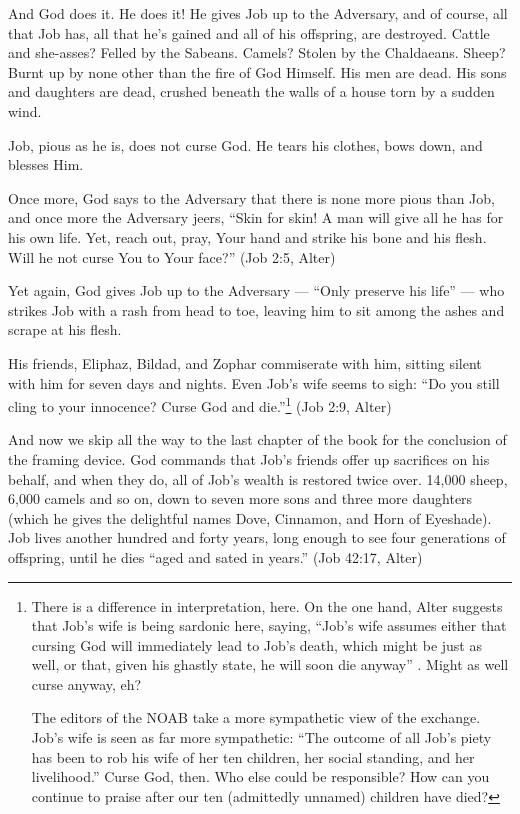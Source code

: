 And God does it. He does it! He gives Job up to the Adversary, and of course, all that Job has, all that he's gained and all of his offspring, are destroyed. Cattle and she-asses? Felled by the Sabeans. Camels? Stolen by the Chaldaeans. Sheep? Burnt up by none other than the fire of God Himself. His men are dead. His sons and daughters are dead, crushed beneath the walls of a house torn by a sudden wind.

Job, pious as he is, does not curse God. He tears his clothes, bows down, and blesses Him.

Once more, God says to the Adversary that there is none more pious than Job, and once more the Adversary jeers, ``Skin for skin! A man will give all he has for his own life. Yet, reach out, pray, Your hand and strike his bone and his flesh. Will he not curse You to Your face?'' (Job 2:5, Alter)

Yet again, God gives Job up to the Adversary --- ``Only preserve his life'' --- who strikes Job with a rash from head to toe, leaving him to sit among the ashes and scrape at his flesh.

His friends, Eliphaz, Bildad, and Zophar commiserate with him, sitting silent with him for seven days and nights. Even Job's wife seems to sigh: ``Do you still cling to your innocence? Curse God and die.''\footnote{There is a difference in interpretation, here. On the one hand, Alter suggests that Job's wife is being sardonic here, saying, ``Job's wife assumes either that cursing God will immediately lead to Job's death, which might be just as well, or that, given his ghastly state, he will soon die anyway'' \parencite[469]{alter}. Might as well curse anyway, eh?

  The editors of the NOAB take a more sympathetic view of the exchange. Job's wife is seen as far more sympathetic: ``The outcome of all Job's piety has been to rob his wife of her ten children, her social standing, and her livelihood.'' \parencite[737]{noab} Curse God, then. Who else could be responsible? How can you continue to praise after our ten (admittedly unnamed) children have died?} (Job 2:9, Alter)

And now we skip all the way to the last chapter of the book for the conclusion of the framing device. God commands that Job's friends offer up sacrifices on his behalf, and when they do, all of Job's wealth is restored twice over. 14,000 sheep, 6,000 camels and so on, down to seven more sons and three more daughters (which he gives the delightful names Dove, Cinnamon, and Horn of Eyeshade). Job lives another hundred and forty years, long enough to see four generations of offspring, until he dies ``aged and sated in years.'' (Job 42:17, Alter)

